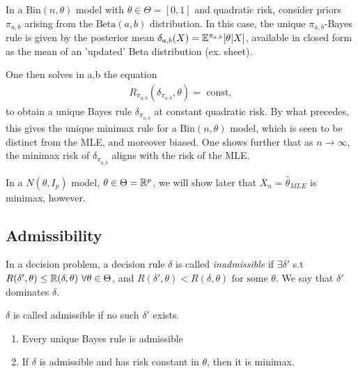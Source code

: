 \documentclass[a4paper]{article}
\begin{document}
\begin{eg}
	In a $\text{Bin}(n,\theta) $ model with $\theta \in \Theta = [0,1]$ and quadratic risk, consider priors $\pi_{a, b}$ arising from the $\text{Beta}(a,b)$ distribution. In this case, the unique $\pi_{a, b}$-Bayes rule is given by the posterior mean $\delta_{a, b}(X) = \mathbb{E}^{\pi_{a,b}} [\theta |X]$, available in closed form as the mean of an 'updated' Beta distribution (ex. sheet).

	One then solves in a,b the equation
	\begin{align*}
		R_{\pi_{a,b}}(\delta_{\pi_{a,b}}, \theta) = \text{ const}
	,\end{align*}
	to obtain a unique Bayes rule $\delta_{\pi_{\overline{a},\overline{b}}}$ at constant quadratic risk. By what precedes, this gives the unique minimax rule for a $\text{Bin}(n, \theta)$ model, which is seen to be distinct from the MLE, and moreover biased. One shows further that as $n\to \infty$, the minimax risk of $\delta_{\pi_{\overline{a},\overline{b}}}$ aligns with the risk of the MLE.
\end{eg}

\begin{remark}
	In a $N(\theta, I_{p})$ model, $\theta \in \Theta = \mathbb{R}^{p}$, we will show later that $\overline{X}_n = \hat{\theta}_{MLE}$ is minimax, however.
\end{remark}

\subsection{Admissibility}

\begin{defn}
	In a decision problem, a decision rule $\delta$ is called \textit{inadmissible} if $\exists \delta' $ s.t $R(\delta', \theta) \le \mathbb{R}(\delta, \theta) \text{ } \forall \theta \in \Theta$, and $R(\delta', \theta) < R(\delta, \theta) \text{ for some } \theta$. We say that $\delta'$ dominates $\delta$.

	$\delta$ is called admissible if no such $\delta'$ exists.
\end{defn}

\begin{prop}
	\begin{enumerate}[label=\roman*)]
		\item Every unique Bayes rule is admissible

		\item If $\delta$ is admissible and has risk constant in $\theta$, then it is minimax.
	\end{enumerate}
\end{prop}
\end{document}
